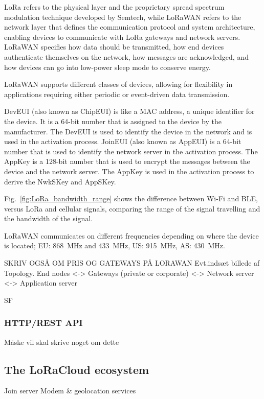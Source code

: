 \ac{LoRa} refers to the physical layer and the proprietary spread spectrum modulation technique developed by Semtech, while \ac{LoRaWAN} refers to the network layer that defines the communication protocol and system architecture, enabling devices to communicate with \ac{LoRa} gateways and network servers. \ac{LoRaWAN} specifies how data should be transmitted, how end devices authenticate themselves on the network, how messages are acknowledged, and how devices can go into low-power sleep mode to conserve energy.

\ac{LoRaWAN} supports different classes of devices, allowing for flexibility in applications requiring either periodic or event-driven data transmission.

\ac{DevEUI} (also known as ChipEUI) is like a \ac{MAC} address, a unique identifier for the device. It is a 64-bit number that is assigned to the device by the manufacturer. The \ac{DevEUI} is used to identify the device in the network and is used in the activation process. \ac{JoinEUI} (also known as AppEUI) is a 64-bit number that is used to identify the network server in the activation process. The AppKey is a 128-bit number that is used to encrypt the messages between the device and the network server. The AppKey is used in the activation process to derive the NwkSKey and AppSKey.



Fig.~\ref{fig:LoRa_bandwidth_range} shows the difference between Wi-Fi and \ac{BLE}, versus \ac{LoRa} and cellular signals, comparing the range of the signal travelling and the bandwidth of the signal.

\ac{LoRaWAN} communicates on different frequencies depending on where the device is located; EU: \SI{868}{\mega\hertz} and \SI{433}{\mega\hertz}, US: \SI{915}{\mega\hertz}, AS: \SI{430}{\mega\hertz}.

SKRIV OGSÅ OM PRIS OG GATEWAYS PÅ LORAWAN
Evt.indsæt billede af Topology. End nodes <-> Gateways (private or corporate) <-> Network server <-> Application server

\ac{SF}

\subsubsection{HTTP/REST API}
Måske vil skal skrive noget om dette

\subsection{The LoRaCloud ecosystem}
Join server
Modem \& geolocation services

